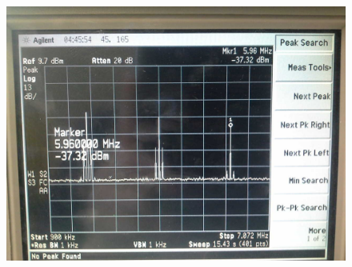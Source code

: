 
\FloatBarrier\begin{figure}[!h]
\centering
\includegraphics[scale=1]{../Grafiken/Frequenzspektrum_c_AmpModuliertTraeger_Oberwellen_2.jpg}
\caption{\label{fig:frequenzspektrum_c_ampmodulierttraeger_oberwellen_2}}
\end{figure}
\FloatBarrier